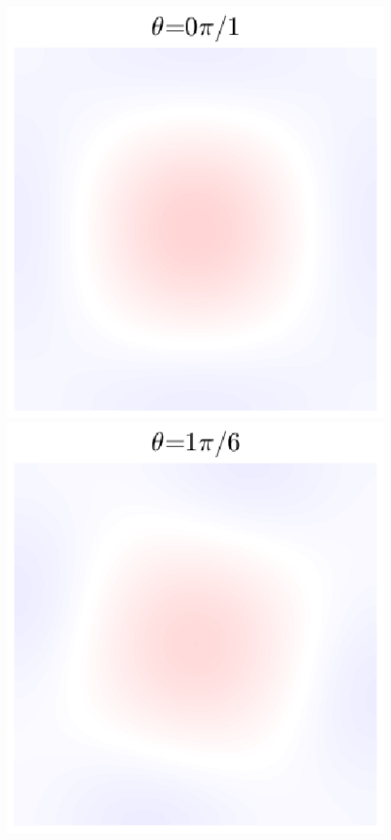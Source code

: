 \begin{figure}
  \centering
  \includegraphics[trim={0.3in 0.3in 0.3in 0.2in},clip]{../matlab/03_aero_optics_acoustics/tunnel_slices/tunnel_acoustic_against_0.6_8_0_0_081.eps}
  \includegraphics[trim={0.3in 0.3in 0.3in 0.2in},clip]{../matlab/03_aero_optics_acoustics/tunnel_slices/tunnel_acoustic_against_0.6_8_0_0.5236_081.eps}

\end{figure}
